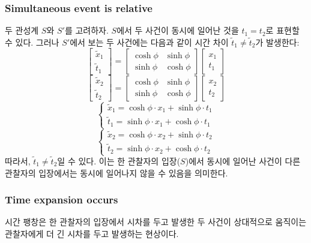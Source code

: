 \documentclass[10pt,a4paper]{article}
\begin{document}
\subsubsection{Simultaneous event is relative}
두 관성계 $S$와 $S'$를 고려하자. $S$에서 두 사건이 동시에 일어난 것을 $t_1 = t_2$로 표현할 수 있다. 그러나 $S'$에서 보는 두 사건에는 다음과 같이 시간 차이 $\tilde{t}_1 \neq \tilde{t}_2$가 발생한다:
\[
    \begin{bmatrix}
        \tilde{x}_1\\\tilde{t}_1
    \end{bmatrix} = 
    \begin{bmatrix}
        \cosh{\phi} & \sinh{\phi}\\
        \sinh{\phi} & \cosh{\phi}
    \end{bmatrix}
    \begin{bmatrix}
        x_1 \\ t_1
    \end{bmatrix}
\]
\[
    \begin{bmatrix}
        \tilde{x}_2\\\tilde{t}_2
    \end{bmatrix} = 
    \begin{bmatrix}
        \cosh{\phi} & \sinh{\phi}\\
        \sinh{\phi} & \cosh{\phi}
    \end{bmatrix}
    \begin{bmatrix}
        x_2 \\ t_2
    \end{bmatrix}
\]
\[
    \begin{cases}
        \tilde{x}_1 = \cosh{\phi}\cdot x_1 + \sinh{\phi}\cdot t_1\\
        \tilde{t}_1 = \sinh{\phi}\cdot x_1 + \cosh{\phi}\cdot t_1
    \end{cases}
\]
\[
    \begin{cases}
        \tilde{x}_2 = \cosh{\phi}\cdot x_2 + \sinh{\phi}\cdot t_2\\
        \tilde{t}_2 = \sinh{\phi}\cdot x_2 + \cosh{\phi}\cdot t_2
    \end{cases}
\]
따라서, $\tilde{t}_1 \neq \tilde{t}_2$일 수 있다. 이는 한 관찰자의 입장($S$)에서 동시에 일어난 사건이 다른 관찰자의 입장에서는 동시에 일어나지 않을 수 있음을 의미한다.

\subsubsection{Time expansion occurs}
시간 팽창은 한 관찰자의 입장에서 시차를 두고 발생한 두 사건이 상대적으로 움직이는 관찰자에게 더 긴 시차를 두고 발생하는 현상이다.
\end{document}
